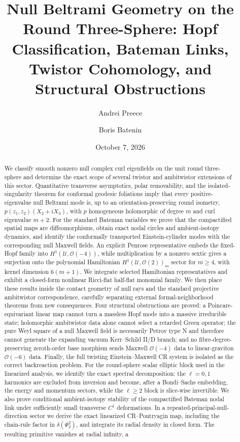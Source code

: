\documentclass[aps,prd,reprint,nofootinbib,superscriptaddress]{revtex4-2}
\theoremstyle{definition}
\theoremstyle{remark}
\begin{document}
\title{Null Beltrami Geometry on the Round Three-Sphere: Hopf Classification, Bateman Links, Twistor Cohomology, and Structural Obstructions}

\author{Andrei Preece}

\author{Boris Batenin}

\date{October 7, 2026}

\begin{abstract}
We classify smooth nonzero null complex curl eigenfields on the unit round three-sphere and determine the exact scope of several twistor and ambitwistor extensions of this sector. Quantitative transverse asymptotics, polar removability, and the isolated-singularity theorem for conformal geodesic foliations imply that every positive-eigenvalue null Beltrami mode is, up to an orientation-preserving round isometry, $p(z_1,z_2)(X_2+iX_3)$, with $p$ homogeneous holomorphic of degree $m$ and curl eigenvalue $m+2$. For the standard Bateman variables we prove that the compactified spatial maps are diffeomorphisms, obtain exact nodal circles and ambient-isotopy dynamics, and identify the conformally transported Einstein-cylinder modes with the corresponding null Maxwell fields. An explicit Penrose representative embeds the fixed-Hopf family into $H^1(\mathcal U,\mathcal O(-4))$, while multiplication by a nonzero sextic gives a surjection onto the polynomial Hamiltonian $H^1(\mathcal U,\mathcal O(2))_m$ sector for $m\ge4$, with kernel dimension $6(m+1)$. We integrate selected Hamiltonian representatives and exhibit a closed-form nonlinear Ricci-flat half-flat monomial family. We then place these results inside the contact geometry of null rays and the standard projective ambitwistor correspondence, carefully separating external formal-neighborhood theorems from new consequences. Four structural obstructions are proved: a Poincare-equivariant linear map cannot turn a massless Hopf mode into a massive irreducible state; holomorphic ambitwistor data alone cannot select a retarded Green operator; the pure Weyl square of a null Maxwell field is necessarily Petrov type N and therefore cannot generate the expanding vacuum Kerr--Schild II/D branch; and no fibre-degree-preserving zeroth-order base morphism sends Maxwell $\mathcal O(-4)$ data to linear-graviton $\mathcal O(-6)$ data. Finally, the full twisting Einstein--Maxwell CR system is isolated as the correct backreaction problem. For the round-sphere scalar elliptic block used in the linearized analysis, we identify the exact spectral decomposition: the $\ell=0,1$ harmonics are excluded from inversion and become, after a Bondi--Sachs embedding, the energy and momentum sectors, while the $\ell\ge2$ block is slice-wise invertible. We also prove conditional ambient-isotopy stability of the compactified Bateman nodal link under sufficiently small transverse $C^1$ deformations. In a repeated-principal-null-direction sector we derive the exact linearized CR--Pontryagin map, including the chain-rule factor in $\delta(\Psi_2^2)$, and integrate its radial density in closed form. The resulting primitive vanishes at radial infinity, a 
\end{abstract}
\end{document}
